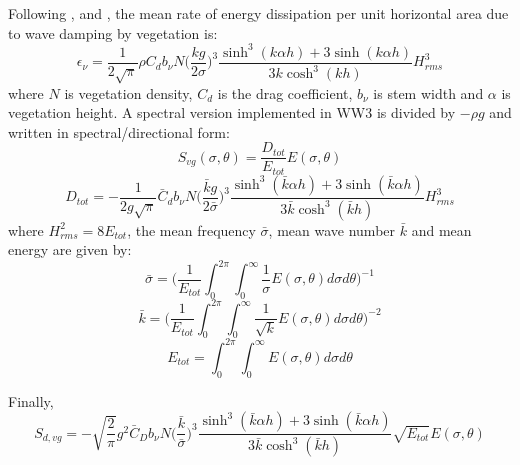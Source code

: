 Following \cite{dalrymple1984wave}, \cite{kobayashi1993wave} and \cite{mendez2004empirical}, the mean rate of energy dissipation per unit horizontal area due to wave damping by vegetation is:
\noindent
\begin{equation}
    \epsilon_{\nu}=\frac{1}{2\sqrt{\pi}}\rho C_db_{\nu} N \Big(\frac{kg}{2\sigma}\Big)^3\frac{\sinh^3(k\alpha h)+3\sinh(k\alpha h)}{3k \cosh^3(kh)}H_{rms}^3
    \label{eq:2}
\end{equation}
\noindent
where $N$ is vegetation density, $C_d$ is the drag coefficient, $b_{\nu}$ is stem width and $\alpha$ is vegetation height.
\noindent
A spectral version implemented in WW3 is divided by $-\rho g$ and written in spectral/directional form:
\begin{equation}
S_{vg}(\sigma,\theta)=\frac{D_{tot}}{E_{tot}}E(\sigma,\theta)
\end{equation}
\noindent
\begin{equation}
D_{tot}=-\frac{1}{2g\sqrt{\pi}} \bar{C}_d b_{\nu} N \Big(\frac{\bar{k}g}{2\bar{\sigma}}\Big)^3\frac{\sinh^3(\bar{k}\alpha h)+3\sinh(\bar{k}\alpha h)}{3\bar{k} \cosh^3(\bar{k}h)}H_{rms}^3
\end{equation}
\noindent
where $H^2_{rms}=8E_{tot}$, the mean frequency $\bar{\sigma}$, mean wave number $\bar{k}$ and mean energy are given by:
\begin{equation}
\bar{\sigma}=\Big(\frac{1}{E_{tot}}\int_{0}^{2\pi} \int_{0}^{\infty} \frac{1}{\sigma}E(\sigma,\theta)d\sigma d\theta\Big)^{-1}
\end{equation}
\noindent
\begin{equation}
\bar{k}=\Big(\frac{1}{E_{tot}}\int_{0}^{2\pi} \int_{0}^{\infty} \frac{1}{\sqrt{k}}E(\sigma,\theta)d\sigma d\theta\Big)^{-2}
\end{equation}
\noindent
\begin{equation}
E_{tot}=\int_{0}^{2\pi} \int_{0}^{\infty} E(\sigma,\theta)d\sigma d\theta
\end{equation}

Finally,
\noindent
\begin{equation}
S_{d,vg}=-\sqrt{\frac{2}{\pi}}g^2 \bar{C}_D b_{\nu} N \Big(\frac{\bar{k}}{\bar{\sigma}}\Big)^3\frac{\sinh^3(\bar{k}\alpha h)+3\sinh(\bar{k}\alpha h)}{3\bar{k} \cosh^3(\bar{k}h)}\sqrt{E_{tot}}E(\sigma,\theta)
\end{equation}

